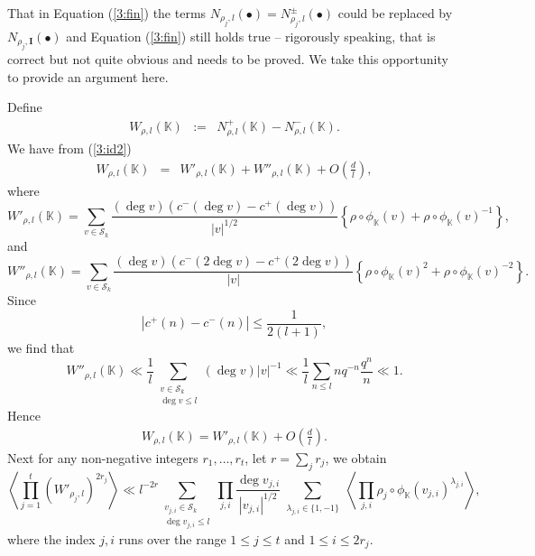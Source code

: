 \documentclass[12pt]{amsart}
\theoremstyle{plain}
\begin{document}
That in Equation (\ref{3:fin}) the terms $N_{\rho_j,l}(\bullet)=N_{\rho_j,l}^{\pm}(\bullet)$ could be replaced by $N_{\rho_j,{{\mathbf I}}}(\bullet)$ and Equation (\ref{3:fin}) still holds true -- rigorously speaking, that is correct but not quite obvious and needs to be proved. We take this opportunity to provide an argument here.

Define
\begin{eqnarray*} W_{\rho,l}({{\mathbb K}}) &:=&N_{\rho,l}^{+}({{\mathbb K}})-N_{\rho,l}^{-}({{\mathbb K}}).\end{eqnarray*}
We have from (\ref{3:id2})
\begin{eqnarray*}
W_{\rho,l}({{\mathbb K}})&=& W'_{\rho,l}({{\mathbb K}})+W''_{\rho,l}({{\mathbb K}}) + O\left(\frac{d}{l}\right),
\end{eqnarray*}
where
\[W'_{\rho,l}({{\mathbb K}})=\sum_{v \in {\mathcal{S}_k}} \frac{(\deg v) \left(c^-(\deg v)-c^{+}(\deg v)\right)}{|v|^{1/2}}\left\{\rho \circ {\phi_{{\mathbb K}}}(v)+\rho \circ {\phi_{{\mathbb K}}}(v)^{-1}\right\},\]
and
\[W''_{\rho,l}({{\mathbb K}})=\sum_{v \in {\mathcal{S}_k}} \frac{(\deg v) \left(c^-(2\deg v)-c^{+}(2\deg v)\right)}{|v|}\left\{\rho \circ {\phi_{{\mathbb K}}}(v)^2+\rho \circ {\phi_{{\mathbb K}}}(v)^{-2}\right\}.\]
Since
\[\left|c^+(n)-c^-(n)\right| \le \frac{1}{2(l+1)}, \]
we find that
\[W''_{\rho,l}({{\mathbb K}}) \ll \frac{1}{l} \sum_{\substack{v \in {\mathcal{S}_k}\\
\deg v \le l}}(\deg v)|v|^{-1}\ll \frac{1}{l} \sum_{n \le l}n q^{-n} \frac{q^n}{n} \ll 1. \]
Hence
\begin{eqnarray} \label{6:wrho} W_{\rho,l}({{\mathbb K}})=W'_{\rho,l}({{\mathbb K}})+O\left(\frac{d}{l}\right). \end{eqnarray}
Next for any non-negative integers $r_1,\ldots,r_t$, let $r=\sum_{j} r_j$, we obtain
\[\left\langle \prod_{j=1}^t(W'_{\rho_j,l})^{2r_j} \right\rangle  \ll l^{-2r} \sum_{\substack{v_{j,i} \in {\mathcal{S}_k}\\
\deg v_{j,i} \le l}} \prod_{j,i} \frac{\deg v_{j,i}}{|v_{j,i}|^{1/2}} \sum_{\substack{\lambda_{j,i} \in \{1,-1\}}} \left\langle \prod_{j,i} \rho_j \circ {\phi_{{\mathbb K}}}(v_{j,i})^{\lambda_{j,i}} \right\rangle,\]
where the index $j,i$ runs over the range $1 \le j \le t$ and $1 \le i \le 2r_j$.
\end{document}
